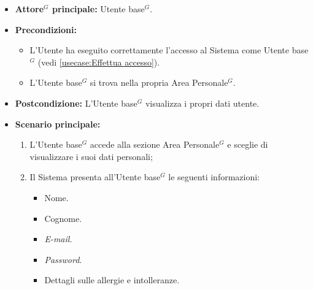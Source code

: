 \label{usecase:Visualizzazione dati utente}
\begin{itemize}
	\item \textbf{\gls{Attore}$^G$ principale:} \gls{Utente base}$^G$.

	\item \textbf{Precondizioni:}
	      \begin{itemize}
		      \item L'Utente ha eseguito correttamente l'accesso al Sistema come
		            \gls{Utente base}$^G$ (vedi \autoref{usecase:Effettua accesso}).
		      \item L'\gls{Utente base}$^G$ si trova nella propria Area Personale$^G$.
	      \end{itemize}

	\item \textbf{Postcondizione:} L'\gls{Utente base}$^G$ visualizza i propri dati utente.

	\item \textbf{Scenario principale:}
	      \begin{enumerate}
		      \item L'\gls{Utente base}$^G$ accede alla sezione Area Personale$^G$ e sceglie di visualizzare i suoi dati personali;
		      \item Il Sistema presenta all'\gls{Utente base}$^G$ le seguenti informazioni:
		            \begin{itemize}
			            \item Nome.
			            \item Cognome.
			            \item \textit{E-mail}.
			            \item \textit{Password}.
			            \item Dettagli sulle allergie e intolleranze.
		            \end{itemize}
	      \end{enumerate}
\end{itemize}
